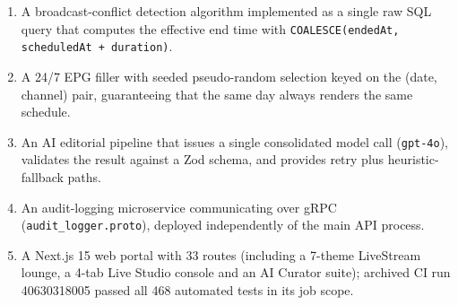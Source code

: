 {\begin{enumerate}[leftmargin=*,itemsep=2pt]
  \item A broadcast-conflict detection algorithm implemented as a
  single raw SQL query that computes the effective end time with
  \texttt{COALESCE(endedAt, scheduledAt + duration)}.
  \item A 24/7 EPG filler with seeded pseudo-random selection keyed on
  the (date, channel) pair, guaranteeing that the same day always
  renders the same schedule.
  \item An AI editorial pipeline that issues a single consolidated model
  call (\texttt{gpt-4o}), validates the result against a Zod schema,
  and provides retry plus heuristic-fallback paths.
  \item An audit-logging microservice communicating over gRPC (\texttt{audit\_logger.proto}), deployed
  independently of the main API process.
  \item A Next.js 15 web portal with 33 routes (including a 7-theme LiveStream lounge, a 4-tab Live Studio console and an AI Curator suite); archived CI run 40630318005 passed all 468 automated tests in its job scope.
\end{enumerate}
}

\subsection{}


